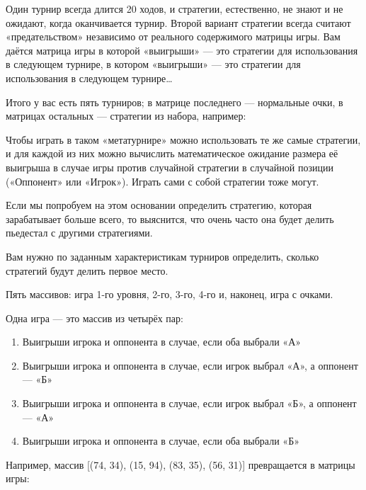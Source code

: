 Один турнир всегда длится 20 ходов, и стратегии, естественно, не знают и не ожидают, когда оканчивается турнир. Второй вариант стратегии всегда считают «предательством» независимо от реального содержимого матрицы игры. Вам даётся матрица игры в которой «выигрыши» — это стратегии для использования в следующем турнире, в котором «выигрыши» — это стратегии для использования в следующем турнире…

Итого у вас есть пять турниров; в матрице последнего — нормальные очки, в матрицах остальных — стратегии из набора, например:


Чтобы играть в таком «метатурнире» можно использовать те же самые стратегии, и для каждой из них можно вычислить математическое ожидание размера её выигрыша в случае игры против случайной стратегии в случайной позиции («Оппонент» или «Игрок»). Играть сами с собой стратегии тоже могут.

Если мы попробуем на этом основании определить стратегию, которая зарабатывает больше всего, то выяснится, что очень часто она будет делить пьедестал с другими стратегиями.

Вам нужно по заданным характеристикам турниров определить, сколько стратегий будут делить первое место.


Пять массивов: игра 1-го уровня, 2-го, 3-го, 4-го и, наконец, игра с очками.

Одна игра — это массив из четырёх пар:

\begin{enumerate}
    \item Выигрыши игрока и оппонента в случае, если оба выбрали «А»
    \item Выигрыши игрока и оппонента в случае, если игрок выбрал «А», \linebreak а оппонент — «Б»
    \item Выигрыши игрока и оппонента в случае, если игрок выбрал «Б», \linebreak а оппонент — «А»
    \item Выигрыши игрока и оппонента в случае, если оба выбрали «Б»
\end{enumerate}

Например, массив [(74, 34), (15, 94), (83, 35), (56, 31)] превращается в матрицы игры:



